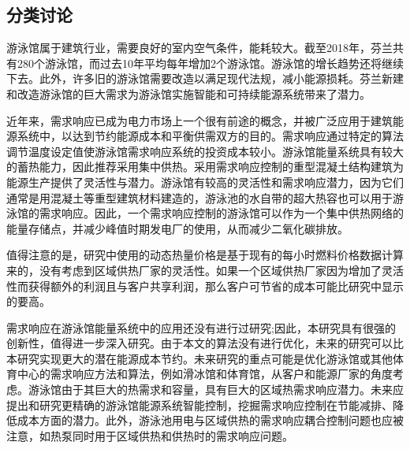 \documentclass[hyperref]{ctexart}
\begin{document}
\begin{multicols}{2}
		\section{分类讨论}
		游泳馆属于建筑行业，需要良好的室内空气条件，能耗较大\cite{article14}。截至2018年，芬兰共有280个游泳馆，而过去10年平均每年增加2个游泳馆。游泳馆的增长趋势还将继续下去。此外，许多旧的游泳馆需要改造以满足现代法规，减小能源损耗。芬兰新建和改造游泳馆的巨大需求为游泳馆实施智能和可持续能源系统带来了潜力。
		\par
		近年来，需求响应已成为电力市场上一个很有前途的概念，并被广泛应用于建筑能源系统中，以达到节约能源成本和平衡供需双方的目的\cite{article41}。需求响应通过特定的算法调节温度设定值使游泳馆需求响应系统的投资成本较小。游泳馆能量系统具有较大的蓄热能力，因此推荐采用集中供热。采用需求响应控制的重型混凝土结构建筑为能源生产提供了灵活性与潜力。游泳馆有较高的灵活性和需求响应潜力，因为它们通常是用混凝土等重型建筑材料建造的，游泳池的水自带的超大热容也可以用于游泳馆的需求响应。因此，一个需求响应控制的游泳馆可以作为一个集中供热网络的能量存储点，并减少峰值时期发电厂的使用，从而减少二氧化碳排放。
		\par
		值得注意的是，研究中使用的动态热量价格是基于现有的每小时燃料价格数据计算来的，没有考虑到区域供热厂家的灵活性。如果一个区域供热厂家因为增加了灵活性而获得额外的利润且与客户共享利润，那么客户可节省的成本可能比研究中显示的要高。
		\par
		需求响应在游泳馆能量系统中的应用还没有进行过研究;因此，本研究具有很强的创新性，值得进一步深入研究。由于本文的算法没有进行优化，未来的研究可以比本研究实现更大的潜在能源成本节约。未来研究的重点可能是优化游泳馆或其他体育中心的需求响应方法和算法，例如滑冰馆和体育馆，从客户和能源厂家的角度考虑。游泳馆由于其巨大的热需求和容量，具有巨大的区域热需求响应潜力。未来应提出和研究更精确的游泳馆能源系统智能控制，挖掘需求响应控制在节能减排、降低成本方面的潜力。此外，游泳池用电与区域供热的需求响应耦合控制问题也应被注意，如热泵同时用于区域供热和供热时的需求响应问题。
		\par

\end{multicols}
\end{document}

